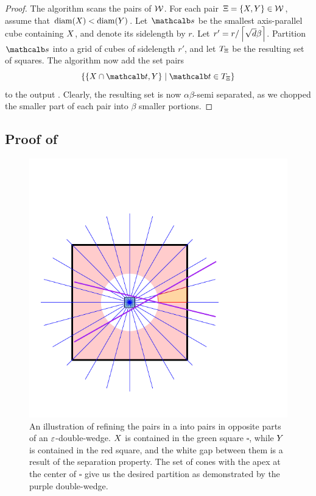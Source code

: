 \documentclass[12pt]{article}%
\begin{document}
\begin{proof}
    The algorithm scans the pairs of $\mathcal{W}$. For each pair
    $\Xi = \{ X, Y \} \in \mathcal{W}$, assume that
    $\diameterX{\PSX} < \diameterX{\PSY}$. Let $\sqr$ be the smallest
    axis-parallel cube containing $X$, and denote its sidelength by
    $r$.  Let $r' = r / \left\lceil {\sqrt{d} \beta } \right\rceil$.  Partition $\sqr$
    into a grid of cubes of sidelength $r'$, and let $T_\Xi$ be the
    resulting set of squares. The algorithm now add the set pairs
    \begin{equation*}
        \Set{ \{ \PSX \cap \sqrA, \PSY \} }{ \sqrA \in T_\Pair }
    \end{equation*}
    to the output \SSPD. Clearly, the resulting set is now
    $\alpha\beta$-semi separated, as we chopped the smaller part of
    each pair into $\beta$ smaller portions.
\end{proof}


\subsection{Proof of }

%
{%
   \LemmaRefineDWBody{}%
}
   
\begin{figure}[ht]
    \centerline{\includegraphics{figs/partition}}
    \caption{An illustration of refining the pairs in a \SSPD into
       pairs in opposite parts of an $\varepsilon$-double-wedge. $X$ is
       contained in the green square $\square$, while $Y$ is
       contained in the red square, and the white gap between them is
       a result of the separation property. The set of cones with the
       apex at the center of $\square$ give us the desired partition
       as demonstrated by the purple double-wedge. }
\end{figure}
\end{document}
